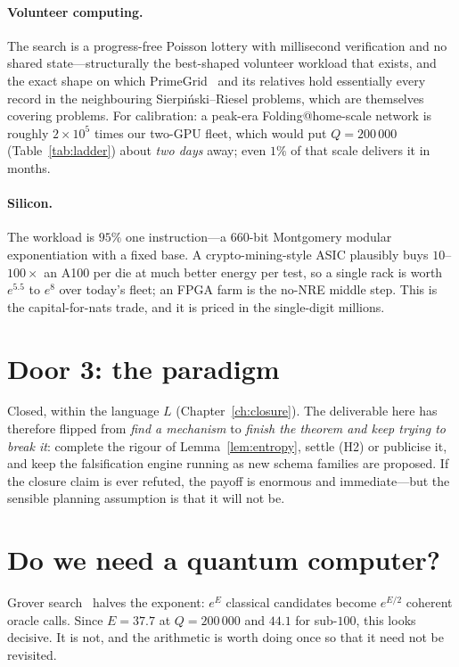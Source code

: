 \paragraph{Volunteer computing.} The search is a progress-free Poisson lottery
with millisecond verification and no shared state---structurally the best-shaped
volunteer workload that exists, and the exact shape on which
PrimeGrid~\cite{PrimeGrid} and its relatives hold essentially every record in
the neighbouring Sierpi\'nski--Riesel problems, which are themselves covering
problems. For calibration: a peak-era Folding@home-scale network is roughly
$2\times10^{5}$ times our two-GPU fleet, which would put $Q=200\,000$
(Table~\ref{tab:ladder}) about \emph{two days} away; even $1\%$ of that scale
delivers it in months.

\paragraph{Silicon.} The workload is $95\%$ one instruction---a
$660$-bit Montgomery modular exponentiation with a fixed base. A
crypto-mining-style ASIC plausibly buys $10$--$100\times$ an A100 per die at
much better energy per test, so a single rack is worth $e^{5.5}$ to $e^{8}$ over
today's fleet; an FPGA farm is the no-NRE middle step. This is the
capital-for-nats trade, and it is priced in the single-digit millions.

\section{Door 3: the paradigm}

Closed, within the language $L$ (Chapter~\ref{ch:closure}). The deliverable here
has therefore flipped from \emph{find a mechanism} to \emph{finish the theorem
and keep trying to break it}: complete the rigour of Lemma~\ref{lem:entropy},
settle (H2) or publicise it, and keep the falsification engine running as new
schema families are proposed. If the closure claim is ever refuted, the payoff
is enormous and immediate---but the sensible planning assumption is that it will
not be.

\section{Do we need a quantum computer?}

Grover search~\cite{Grover} halves the exponent: $e^{E}$ classical candidates
become $e^{E/2}$ coherent oracle calls. Since $E=37.7$ at $Q=200\,000$ and
$44.1$ for sub-$100$, this looks decisive. It is not, and the arithmetic is
worth doing once so that it need not be revisited.

